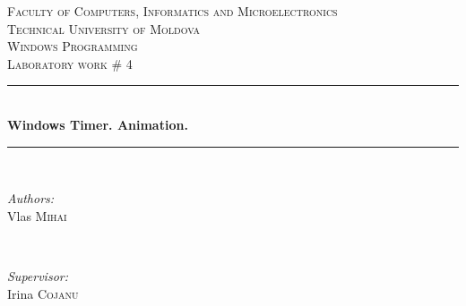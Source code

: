 \documentclass[12pt]{article}
\begin{document}
  \begin{titlepage}

 \newcommand{\HRule}{\rule{\linewidth}{0.5mm}} %
  \begin{center} %

  \textsc{\large Faculty of Computers, Informatics and Microelectronics}\\[0.5cm]
  \textsc{\large Technical University of Moldova}\\[1.2cm] %
  \vspace{35 mm}
  \textsc{\Large Windows Programming}\\[0.5cm] %
  \textsc{\large Laboratory work \# 4}\\[0.5cm] %

  \vspace{10 mm}
  \HRule \\[0.4cm]
  { \LARGE \bfseries Windows Timer. Animation.}\\[0.4cm] %
  \HRule \\[1.5cm]

      \vspace{30mm}

      \begin{minipage}{0.4\textwidth}
      \begin{flushleft} \large
      \emph{Authors:}\\
      Vlas \textsc{Mihai}
      \end{flushleft}
      \end{minipage}
      ~
      \begin{minipage}{0.4\textwidth}
      \begin{flushright} \large
      \emph{Supervisor:} \\
      Irina \textsc{Cojanu} %
      \end{flushright}
      \end{minipage}\\[4cm]


\end{center}
\end{titlepage}
\end{document}
